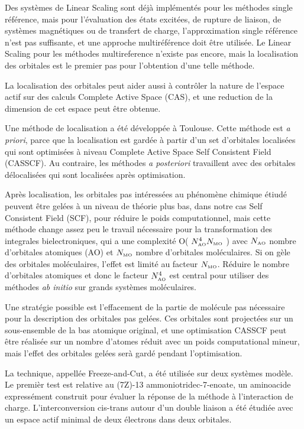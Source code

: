 Des syst\`emes de Linear Scaling sont d\'ej\`a impl\'ement\'es pour les m\'ethodes
single r\'ef\'erence, mais pour l'\'evaluation des \'etats excit\'ees, de
rupture de liaison, de syst\`emes magn\'etiques ou de transfert de charge,
l'approximation single r\'ef\'erence n'est pas suffisante, et une approche
multir\'ef\'erence doit \^etre utilis\'ee.  Le Linear Scaling pour les m\'ethodes
multireference n'existe pas encore, mais la localisation des orbitales est
le premier pas pour l'obtention d'une telle m\'ethode.

La localisation des orbitales peut aider aussi \`a contr\^oler la nature de
l'espace actif sur des calculs Complete Active Space (CAS), et une reduction
de la dimension de cet espace peut \^etre obtenue.

Une m\'ethode de localisation a \'et\'e d\'evelopp\'ee \`a Toulouse. Cette m\'ethode 
est \textit{a priori}, parce que la localisation est gard\'ee \`a partir d'un
set d'orbitales localis\'ees qui sont optimis\'ees \`a niveau Complete
Active Space Self Consistent Field (CASSCF). Au contraire, les m\'ethodes
\textit{a posteriori} travaillent avec des orbitales d\'elocalis\'ees qui
sont localis\'ees apr\`es optimisation. 

Apr\`es localisation, les orbitales pas int\'eress\'ees au ph\'enom\`ene
chimique \'etiud\'e peuvent \^etre gel\'ees \`a un niveau de th\'eorie plus bas,
dans notre cas Self Consistent Field (SCF), pour r\'eduire le poids
computationnel, mais cette m\'ethode change assez peu le travail
n\'ecessaire pour la transformation des integrales bielectroniques, qui a une
complexit\'e O( $N_{\mbox{\tiny AO}}^4 N_{\mbox{\tiny MO}}$ ) avec
$N_{\mbox{\tiny AO}}$ nombre d'orbitales atomiques (AO) et
$N_{\mbox{\tiny MO}}$ nombre d'orbitales mol\'eculaires. Si on g\`ele des
orbitales mol\'eculaires, l'effet est limit\'e au facteur $N_{\mbox{\tiny
MO}}$.  R\'eduire le nombre d'orbitales atomiques et donc le facteur
$N_{\mbox{\tiny AO}}^4$ est central pour utiliser des m\'ethodes \textit{ab
initio} sur grands syst\`emes mol\'eculaires. 

Une strat\'egie possible est l'effacement de la partie de mol\'ecule
pas n\'ecessaire pour la description des orbitales pas gel\'ees. Ces
orbitales sont project\'ees sur un sous-ensemble de la bas atomique
original, et une optimisation CASSCF peut \^etre r\'ealis\'ee sur un nombre
d'atomes r\'eduit avec un poids computational mineur, mais l'effet des
orbitales gel\'ees ser\`a gard\'e pendant l'optimisation.

La technique, appell\'ee Freeze-and-Cut, a \'et\'e utilis\'ee sur deux
syst\`emes mod\`ele. Le premi\`er test est relative au (7Z)-13
ammoniotridec-7-enoate, un aminoacide express\'ement construit pour
\'evaluer la r\'eponse de la m\'ethode \`a l'interaction de charge.
L'interconversion cis-trans autour d'un double liaison a \'et\'e \'etudi\'ee
avec un espace actif minimal de deux \'electrons dans deux orbitales. 

